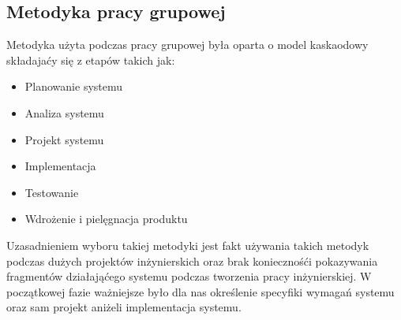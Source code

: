 \subsection{Metodyka pracy grupowej}
Metodyka użyta podczas pracy grupowej była oparta o model kaskaodowy składajaćy się z etapów takich jak:
\begin{itemize}
	\item Planowanie systemu
	\item Analiza systemu
	\item Projekt systemu
	\item Implementacja
	\item Testowanie
	\item Wdrożenie i pielęgnacja produktu
\end{itemize}
Uzasadnieniem wyboru takiej metodyki jest fakt używania takich metodyk podczas dużych projektów inżynierskich oraz brak koniecznośći pokazywania fragmentów działająćego systemu podczas tworzenia pracy inżynierskiej. W początkowej fazie ważniejsze było dla nas określenie specyfiki wymagań systemu oraz sam projekt aniżeli implementacja systemu.